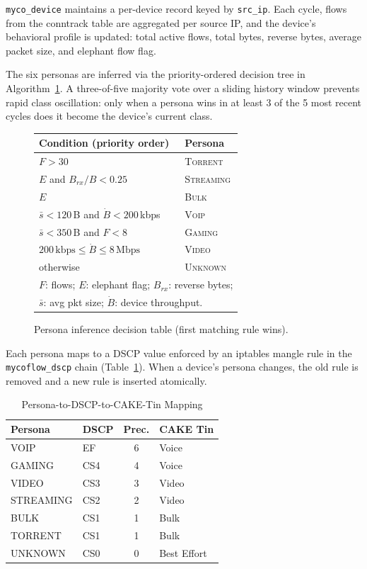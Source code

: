 \documentclass[conference]{IEEEtran}
\begin{document}
\texttt{myco\_device} maintains a per-device record keyed by \texttt{src\_ip}.
Each cycle, flows from the conntrack table are aggregated per source IP,
and the device's behavioral profile is updated: total active flows, total
bytes, reverse bytes, average packet size, and elephant flow flag.

The six personas are inferred via the priority-ordered decision tree in
Algorithm~\ref{alg:persona}.
A three-of-five majority vote over a sliding history window prevents
rapid class oscillation: only when a persona wins in at least 3 of the
5 most recent cycles does it become the device's current class.

\begin{figure}[t]
\centering
\small
\begin{tabular}{p{}p{}}
\toprule
\textbf{Condition (priority order)} & \textbf{Persona} \\
\midrule
$F > 30$ & \textsc{Torrent} \\
$E$ and $B_{rx}/B < 0.25$ & \textsc{Streaming} \\
$E$ & \textsc{Bulk} \\
$\bar{s} < 120$\,B and $\dot{B} < 200$\,kbps & \textsc{Voip} \\
$\bar{s} < 350$\,B and $F < 8$ & \textsc{Gaming} \\
$200\,\text{kbps} \le \dot{B} \le 8\,\text{Mbps}$ & \textsc{Video} \\
otherwise & \textsc{Unknown} \\
\bottomrule
\multicolumn{2}{l}{\footnotesize $F$: flows; $E$: elephant flag; $B_{rx}$: reverse bytes;} \\
\multicolumn{2}{l}{\footnotesize $\bar{s}$: avg pkt size; $\dot{B}$: device throughput.} \\
\end{tabular}
\caption{Persona inference decision table (first matching rule wins).}
\label{alg:persona}
\end{figure}

Each persona maps to a DSCP value enforced by an iptables mangle rule in
the \texttt{mycoflow\_dscp} chain (Table~\ref{tab:dscpmap}).
When a device's persona changes, the old rule is removed and a new rule
is inserted atomically.
\begin{table}[t]
\caption{Persona-to-DSCP-to-CAKE-Tin Mapping}
\label{tab:dscpmap}
\centering
\small
\begin{tabular}{llcl}
\toprule
\textbf{Persona} & \textbf{DSCP} & \textbf{Prec.} & \textbf{CAKE Tin} \\
\midrule
VOIP      & EF   & 6 & Voice      \\
GAMING    & CS4  & 4 & Voice      \\
VIDEO     & CS3  & 3 & Video      \\
STREAMING & CS2  & 2 & Video      \\
BULK      & CS1  & 1 & Bulk       \\
TORRENT   & CS1  & 1 & Bulk       \\
UNKNOWN   & CS0  & 0 & Best Effort\\
\bottomrule
\end{tabular}
\end{table}
\end{document}
